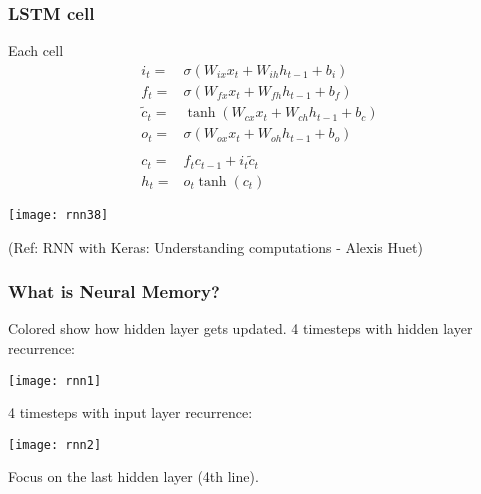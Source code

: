 \begin{frame}[fragile] \frametitle{LSTM cell}
Each cell
\begin{align*}
i_t =& \sigma(W_{ix} x_t + W_{ih} h_{t-1} + b_i) \\
f_t =& \sigma(W_{fx} x_t + W_{fh} h_{t-1} + b_f) \\
\tilde{c}_t =& \tanh(W_{cx} x_t + W_{ch} h_{t-1} + b_c) \\
o_t =& \sigma(W_{ox} x_t + W_{oh} h_{t-1} + b_o) \\
 \\
c_t =& f_t c_{t-1} + i_t \tilde{c}_t \\
h_t =& o_t \tanh(c_t)
\end{align*} %


\begin{center}
\texttt{[image: rnn38]}

{\tiny (Ref: RNN with Keras: Understanding computations - Alexis Huet)}
\end{center}
\end{frame}


\begin{frame}[fragile] \frametitle{What is Neural Memory?}
Colored show how hidden layer gets updated. 
4 timesteps with hidden layer recurrence:
\begin{center}
\texttt{[image: rnn1]}
\end{center}
4 timesteps with input  layer recurrence:
\begin{center}
\texttt{[image: rnn2]}
\end{center}
Focus on the last hidden layer (4th line).
\end{frame}


